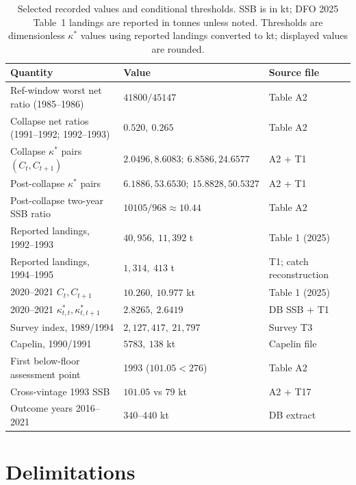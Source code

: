 \documentclass[10pt,twocolumn]{article}
\theoremstyle{plain}
\theoremstyle{remark}
\begin{document}
\begin{table}[t]
\centering
\scriptsize
\setlength{\tabcolsep}{2.8pt}
\caption{Selected recorded values and conditional thresholds. SSB is in kt; DFO 2025 Table~1 landings are reported in tonnes unless noted. Thresholds are dimensionless \(\kappa^*\) values using reported landings converted to kt; displayed values are rounded.}
\label{tab:summary}
\begin{tabular}{@{}l l l@{}}
\toprule
Quantity & Value & Source file \\
\midrule
Ref-window worst net ratio (1985--1986) & \(41800/45147\) & Table A2 \\
Collapse net ratios (1991--1992; 1992--1993) & \(0.520,\ 0.265\) & Table A2 \\
Collapse \(\kappa^*\) pairs \((C_t,C_{t+1})\) & \(2.0496,8.6083;\ 6.8586,24.6577\) & A2 + T1 \\
Post-collapse \(\kappa^*\) pairs & \(6.1886,53.6530;\ 15.8828,50.5327\) & A2 + T1 \\
Post-collapse two-year SSB ratio & \(10105/968 \approx 10.44\) & Table A2 \\
Reported landings, 1992--1993 & \(40{,}956,\ 11{,}392\) t & Table 1 (2025) \\
Reported landings, 1994--1995 & \(1{,}314,\ 413\) t & T1; catch reconstruction \\
2020--2021 \(C_t,C_{t+1}\) & \(10.260,\ 10.977\) kt & Table 1 (2025) \\
2020--2021 \(\kappa^*_{t,t},\kappa^*_{t,t+1}\) & \(2.8265,\ 2.6419\) & DB SSB + T1 \\
Survey index, 1989/1994 & \(2{,}127{,}417,\ 21{,}797\) & Survey T3 \\
Capelin, 1990/1991 & \(5783,\ 138\) kt & Capelin file \\
First below-floor assessment point & 1993 (\(101.05 < 276\)) & Table A2 \\
Cross-vintage 1993 SSB & \(101.05\) vs \(79\) kt & A2 + T17 \\
Outcome years 2016--2021 & \(340\)--\(440\) kt & DB extract \\
\bottomrule
\end{tabular}
\end{table}

\section{Delimitations}\label{scope}
\end{document}
